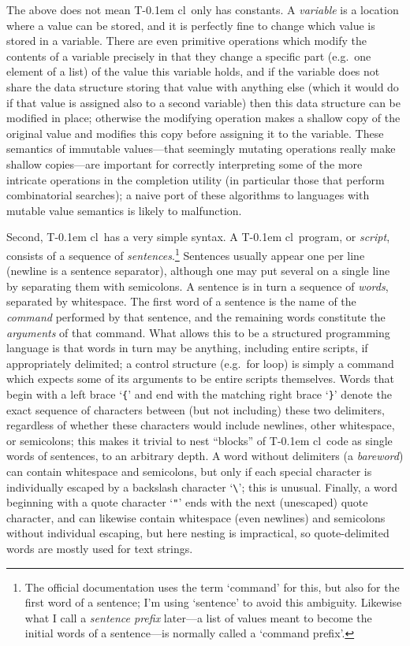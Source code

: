 \documentclass{article}
\theoremstyle{definition}
\newcommand{\Tcl}{T\kern-0.1em cl}
\begin{document}
The above does not mean \Tcl\ only has constants. A \emph{variable} 
is a location where a value can be stored, and it is perfectly fine 
to change which value is stored in a variable. There are even 
primitive operations which modify the contents of a variable precisely 
in that they change a specific part (e.g.~one element of a list) of 
the value this variable holds, and if the variable does not share the 
data structure storing that value with anything else (which it would 
do if that value is assigned also to a second variable) then this data 
structure can be modified in place; otherwise the modifying operation 
makes a shallow copy of the original value and modifies this copy 
before assigning it to the variable. These semantics of immutable 
values---that seemingly mutating operations really make shallow 
copies---are important for correctly interpreting some of the more 
intricate operations in the completion utility (in particular those 
that perform combinatorial searches); a naive port of these algorithms 
to languages with mutable value semantics is likely to malfunction.

Second, \Tcl\ has a very simple syntax. A \Tcl\ program, or 
\emph{script}, consists of a sequence of \emph{sentences}.\footnote{
  The official documentation uses the term `command' for this, but 
  also for the first word of a sentence; I'm using `sentence' to 
  avoid this ambiguity. Likewise what I call a \emph{sentence prefix} 
  later---a list of values meant to become the initial words of a 
  sentence---is normally called a `command prefix'.
} Sentences usually appear one per line (newline is a sentence 
separator), although one may put several on a single line by separating 
them with semicolons. A sentence is in turn a sequence of 
\emph{words}, separated by whitespace. The first word of a sentence 
is the name of the \emph{command} performed by that sentence, and the 
remaining words constitute the \emph{arguments} of that command. What 
allows this to be a structured programming language is that words in 
turn may be anything, including entire scripts, if appropriately 
delimited; a control structure (e.g.~for loop) is simply a command 
which expects some of its arguments to be entire scripts themselves. 
Words that begin with a left brace `\verb|{|' and end with the matching 
right brace `\verb|}|' denote the exact sequence of characters between 
(but not including) these two delimiters, regardless of whether these 
characters would include newlines, other whitespace, or semicolons; 
this makes it trivial to nest ``blocks'' of \Tcl\ code as single words 
of sentences, to an arbitrary depth. A word without delimiters (a 
\emph{bareword}) can contain whitespace and semicolons, but only if 
each special character is individually escaped by a backslash 
character `\verb|\|'; this is unusual. Finally, a word beginning with 
a quote character `\verb|"|' ends with the next (unescaped) quote 
character, and can likewise contain whitespace (even newlines) and 
semicolons without individual escaping, but here nesting is 
impractical, so quote-delimited words are mostly used for text 
strings.
\end{document}
